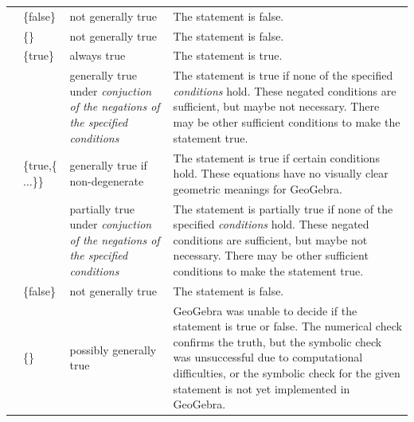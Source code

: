 \documentclass{article}
\begin{document}
\begin{tabular}{|>{\raggedright}m{}|>{\centering}m{}|>{\centering}m{}|>{\centering}m{}|}
\hline 
\multirow{2}{0.15\textwidth}{\centerline{\footnotesize{}false}} & {\footnotesize{}\{false\}} & {\footnotesize{}not generally true\footnotemark[2]} & {\footnotesize{}The statement is false.}\tabularnewline
\cline{2-4} 
 & {\footnotesize{}\{\}} & {\footnotesize{}not generally true\footnotemark[2]} & {\footnotesize{}The statement is false.}\tabularnewline
\hline 
\multirow{5}{0.15\textwidth}{\centerline{\footnotesize{}undefined}} & {\footnotesize{}\{true\}} & {\footnotesize{}always true} & {\footnotesize{}The statement is true.}\tabularnewline
\cline{2-4} 
 & \multicolumn{1}{>{\centering}m{0.2\columnwidth}|}{{\footnotesize{}\{true,\{}\emph{\footnotesize{}conditions}{\footnotesize{}\}\}}} & {\footnotesize{}generally true under }\emph{\footnotesize{}conjuction of the negations of the specified
conditions} & {\footnotesize{}The statement is true if none of the specified }\emph{\footnotesize{}conditions}{\footnotesize{}
hold. These negated conditions are sufficient, but maybe not necessary. There
may be other sufficient conditions to make the statement true.}\tabularnewline
\cline{2-4} 
 & {\footnotesize{}\{true,\{$\ldots$\}\}} & {\footnotesize{}generally true if non-degenerate} & {\footnotesize{}The statement is true if certain conditions hold.
These equations have no visually clear geometric meanings for GeoGebra.}\tabularnewline
\cline{2-4} 
 & \multicolumn{1}{>{\centering}m{0.2\columnwidth}|}{{\footnotesize{}\{true,\{}\emph{\footnotesize{}conditions}{\footnotesize{}\},``c''\}}} & {\footnotesize{}partially true under }\emph{\footnotesize{}conjuction of the negations of the specified
conditions} & {\footnotesize{}The statement is partially true if none of the specified }\emph{\footnotesize{}conditions}{\footnotesize{}
hold. These negated conditions are sufficient, but maybe not necessary. There
may be other sufficient conditions to make the statement true.}\tabularnewline
\cline{2-4} 
 & {\footnotesize{}\{false\}} & {\footnotesize{}not generally true\footnotemark[2]} & {\footnotesize{}The statement is false.}\tabularnewline
\cline{2-4} 
 & {\footnotesize{}\{\}} & {\footnotesize{}possibly generally true} & {\footnotesize{}GeoGebra was unable to decide if the statement is
true or false. The numerical check confirms the truth, but the symbolic
check was unsuccessful due to computational difficulties, or the symbolic
check for the given statement is not yet implemented in GeoGebra.}\tabularnewline
\hline 
\end{tabular}
\end{document}
